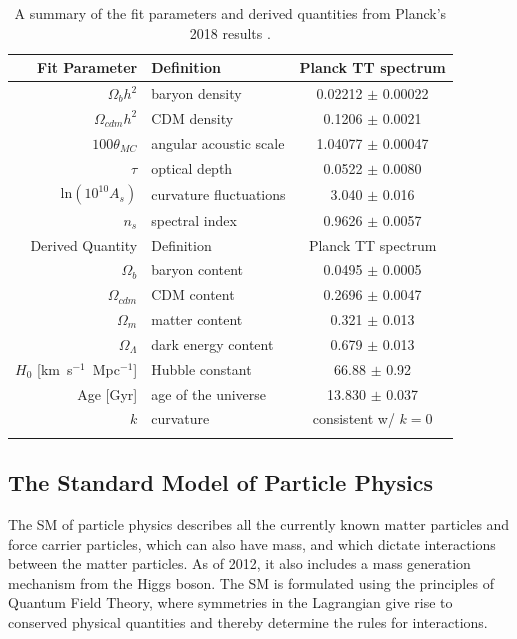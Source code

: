 \begin{table}[htbp]
\caption{A summary of the fit parameters and derived quantities from Planck's 2018 results \cite{Planck2018}.}
\begin{center}
\begin{tabular}{ r l c }
\hline
Fit Parameter & Definition &  Planck TT spectrum \\
\hline
$\Omega_{b}h^{2}$ & baryon density & 0.02212 $\pm$ 0.00022 \\
$\Omega_{cdm}h^{2}$ & CDM density & 0.1206 $\pm$ 0.0021 \\
$100\theta_{MC}$ & angular acoustic scale & 1.04077 $\pm$ 0.00047 \\
$\tau$ & optical depth & 0.0522 $\pm$ 0.0080 \\
ln$(10^{10}A_{s})$ & curvature fluctuations & 3.040 $\pm$ 0.016 \\
$n_{s}$ & spectral index & 0.9626 $\pm$ 0.0057 \\
\hline
Derived Quantity & Definition &  Planck TT spectrum \\
\hline
$\Omega_{b}$ & baryon content & 0.0495 $\pm$ 0.0005 \\
$\Omega_{cdm}$ & CDM content & 0.2696 $\pm$ 0.0047 \\
$\Omega_{m}$  & matter content & 0.321 $\pm$ 0.013 \\
$\Omega_{\Lambda}$  & dark energy content & 0.679 $\pm$ 0.013 \\
$H_{0}$ [km~s$^{-1}$~Mpc$^{-1}$] & Hubble constant & 66.88 $\pm$ 0.92 \\
Age [Gyr]  & age of the universe & 13.830 $\pm$  0.037 \\
$k$ & curvature & consistent w/ $k=0$ \\
\label{tb:planck}
\end{tabular}
\end{center}
\label{default}
\end{table}%


\FloatBarrier
\subsection{The Standard Model of Particle Physics}
The \ac{SM} of particle physics describes all the currently known matter particles and force carrier particles, which can also have mass, and which dictate interactions between the matter particles. As of 2012, it also includes a mass generation mechanism from the Higgs boson. The \ac{SM} is formulated using the principles of Quantum Field Theory, where symmetries in the Lagrangian give rise to conserved physical quantities and thereby determine the rules for interactions.

